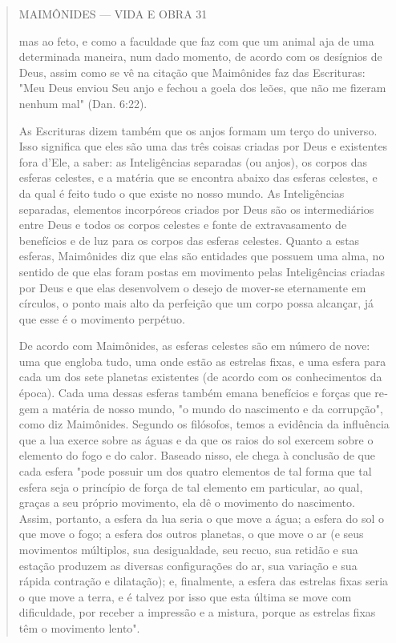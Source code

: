 \begin{quote}
MAIMÔNIDES --- VIDA E OBRA 31

mas ao feto, e como a faculdade que faz com que um animal aja de uma
deter­minada maneira, num dado momento, de acordo com os desígnios de
Deus, assim como se vê na citação que Maimônides faz das Escrituras:
"Meu Deus en­viou Seu anjo e fechou a goela dos leões, que não me
fizeram nenhum mal" (Dan. 6:22).

As Escrituras dizem também que os anjos formam um terço do uni­verso.
Isso significa que eles são uma das três coisas criadas por Deus e
existen­tes fora d'Ele, a saber: as Inteligências separadas (ou anjos),
os corpos das esfe­ras celestes, e a matéria que se encontra abaixo das
esferas celestes, e da qual é feito tudo o que existe no nosso mundo. As
Inteligências separadas, elemen­tos incorpóreos criados por Deus são os
intermediários entre Deus e todos os corpos celestes e fonte de
extravasamento de benefícios e de luz para os cor­pos das esferas
celestes. Quanto a estas esferas, Maimônides diz que elas são entidades
que possuem uma alma, no sentido de que elas foram postas em mo­vimento
pelas Inteligências criadas por Deus e que elas desenvolvem o desejo de
mover-se eternamente em círculos, o ponto mais alto da perfeição que um
corpo possa alcançar, já que esse é o movimento perpétuo.

De acordo com Maimônides, as esferas celestes são em número de nove: uma
que engloba tudo, uma onde estão as estrelas fixas, e uma esfera para
cada um dos sete planetas existentes (de acordo com os conhecimentos da
época). Cada uma dessas esferas também emana benefícios e forças que
re­gem a matéria de nosso mundo, "o mundo do nascimento e da corrupção",
como diz Maimônides. Segundo os filósofos, temos a evidência da
influência que a lua exerce sobre as águas e da que os raios do sol
exercem sobre o ele­mento do fogo e do calor. Baseado nisso, ele chega à
conclusão de que cada esfera "pode possuir um dos quatro elementos de
tal forma que tal esfera seja o princípio de força de tal elemento em
particular, ao qual, graças a seu próprio movimento, ela dê o movimento
do nascimento. Assim, portanto, a esfera da lua seria o que move a água;
a esfera do sol o que move o fogo; a esfera dos outros planetas, o que
move o ar (e seus movimentos múltiplos, sua desigual­dade, seu recuo,
sua retidão e sua estação produzem as diversas configurações do ar, sua
variação e sua rápida contração e dilatação); e, finalmente, a esfera
das estrelas fixas seria o que move a terra, e é talvez por isso que
esta última se move com dificuldade, por receber a impressão e a
mistura, porque as estre­las fixas têm o movimento lento".


\end{quote}
